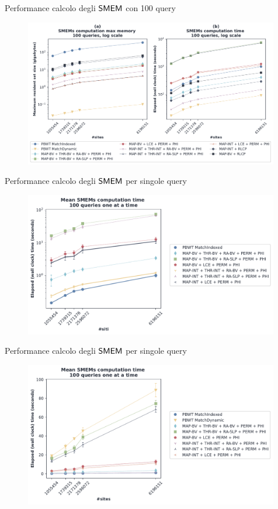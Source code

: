 \documentclass[]{beamer}
\def\SMEM{\mbox{\rm {\sf SMEM}}}
\begin{document}
\begin{frame}[plain]{Performance calcolo degli $\SMEM$ con 100 query}
  \begin{figure}[H]
    \centering
    \includegraphics[width=0.99\textwidth]{img/exe_time_mem_paper.pdf}
  \end{figure}
\end{frame}
\begin{frame}[plain]{Performance calcolo degli $\SMEM$ per singole query}
  \begin{figure}[H]
    \centering
    \includegraphics[width=0.99\textwidth]{img/exe_time_single_paper2.pdf}
  \end{figure}
\end{frame}
\begin{frame}[plain]{Performance calcolo degli $\SMEM$ per singole query}
  \begin{figure}[H]
    \centering
    \includegraphics[width=0.99\textwidth]{img/exe_time_single_paper.pdf}
  \end{figure}
\end{frame}
\end{document}
